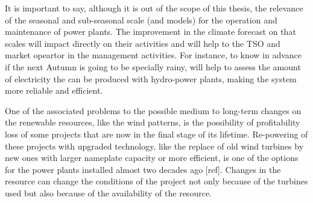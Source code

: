 It is important to say, although it is out of the scope of this thesis, the relevance of the seasonal and sub-seasonal scale (and models) for the operation and maintenance of power plants. The improvement in the climate forecast on that scales will impact directly on their activities and will help to the TSO and market opeartor in the management activities. For instance, to know in advance if the next Autumn is going to be specially rainy, will help to assess the amount of electricity the can be produced with hydro-power plants, making the system more reliable and efficient.


One of the associated problems to the possible medium to long-term changes on the renewable resources, like the wind patterns, is the possibility of profitability loss of some projects that are now in the final stage of its lifetime. Re-powering of these projects with upgraded technology, like the replace of old wind turbines by new ones with larger nameplate capacity or more efficient, is one of the options for the power plants installed almost two decades ago [ref]. Changes in the resource can change the conditions of the project not only because of the turbines used but also because of the availability of the resource.  
 


